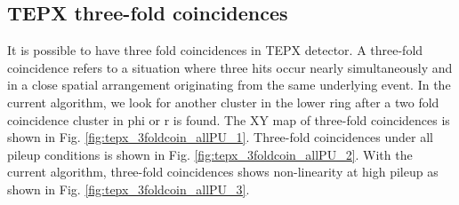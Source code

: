 \subsection{TEPX three-fold coincidences}

It is possible to have three fold coincidences in TEPX detector. A three-fold coincidence refers to a situation where three hits occur nearly simultaneously and in a close spatial arrangement originating from the same underlying event. In the current algorithm, we look for another cluster in the lower ring after a two fold coincidence cluster in phi or r is found. The XY map of three-fold coincidences is shown in Fig. \ref{fig:tepx_3foldcoin_allPU_1}. Three-fold coincidences under all pileup conditions is shown in Fig.  \ref{fig:tepx_3foldcoin_allPU_2}.  With the current algorithm, three-fold coincidences shows non-linearity at high pileup as shown in Fig. \ref{fig:tepx_3foldcoin_allPU_3}. %

